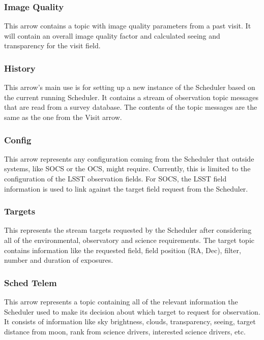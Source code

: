 \documentclass[]{spie}  %
\begin{document}
\subsubsection{Image Quality}

This arrow contains a topic with image quality parameters from a past visit. It will contain an overall image quality factor and calculated seeing and transparency for the visit field.

\subsubsection{History}

This arrow's main use is for setting up a new instance of the Scheduler based on the current running Scheduler. It contains a stream of observation topic messages that are read from a survey database. The contents of the topic messages are the same as the one from the Visit arrow.

\subsubsection{Config}

This arrow represents any configuration coming from the Scheduler that outside systems, like SOCS or the OCS, might require. Currently, this is limited to the configuration of the LSST observation fields. For SOCS, the LSST field information is used to link against the target field request from the Scheduler.

\subsubsection{Targets}

This represents the stream targets requested by the Scheduler after considering all of the environmental, observatory and science requirements. The target topic contains information like the requested field, field position (RA, Dec), filter, number and duration of exposures. 

\subsubsection{Sched Telem}

This arrow represents a topic containing all of the relevant information the Scheduler used to make its decision about which target to request for observation. It consists of information like sky brightness, clouds, transparency, seeing, target distance from moon, rank from science drivers, interested science drivers, etc. 
\end{document}
